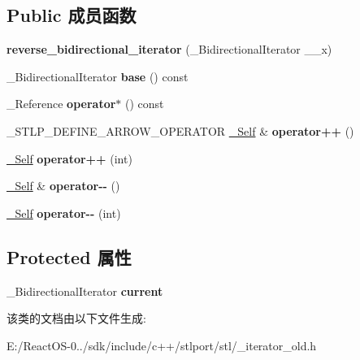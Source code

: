 \subsection*{Public 成员函数}
\begin{DoxyCompactItemize}
\item 
\mbox{\label{classreverse__bidirectional__iterator_a68f458f3d096b036aea2db262d3d57cf}} 
{\bfseries reverse\+\_\+bidirectional\+\_\+iterator} (\+\_\+\+Bidirectional\+Iterator \+\_\+\+\_\+x)
\item 
\mbox{\label{classreverse__bidirectional__iterator_a115b08a7672cf32547b59628d62e228e}} 
\+\_\+\+Bidirectional\+Iterator {\bfseries base} () const
\item 
\mbox{\label{classreverse__bidirectional__iterator_aca35f4162e15e129ca095767829677f9}} 
\+\_\+\+Reference {\bfseries operator$\ast$} () const
\item 
\mbox{\label{classreverse__bidirectional__iterator_a85007a3b88e5503216549b469449a344}} 
\+\_\+\+S\+T\+L\+P\+\_\+\+D\+E\+F\+I\+N\+E\+\_\+\+A\+R\+R\+O\+W\+\_\+\+O\+P\+E\+R\+A\+T\+OR \hyperlink{classreverse__bidirectional__iterator}{\+\_\+\+Self} \& {\bfseries operator++} ()
\item 
\mbox{\label{classreverse__bidirectional__iterator_a14fd29eeb63789552e0a4ec80a89f7f7}} 
\hyperlink{classreverse__bidirectional__iterator}{\+\_\+\+Self} {\bfseries operator++} (int)
\item 
\mbox{\label{classreverse__bidirectional__iterator_a3a09dadb81cd2080c273f46ac3566453}} 
\hyperlink{classreverse__bidirectional__iterator}{\+\_\+\+Self} \& {\bfseries operator-\/-\/} ()
\item 
\mbox{\label{classreverse__bidirectional__iterator_a89202bfc8503efca23e3a146cbdfde9a}} 
\hyperlink{classreverse__bidirectional__iterator}{\+\_\+\+Self} {\bfseries operator-\/-\/} (int)
\end{DoxyCompactItemize}
\subsection*{Protected 属性}
\begin{DoxyCompactItemize}
\item 
\mbox{\label{classreverse__bidirectional__iterator_af65fbccd930a5f03a231408dd84368d3}} 
\+\_\+\+Bidirectional\+Iterator {\bfseries current}
\end{DoxyCompactItemize}


该类的文档由以下文件生成\+:\begin{DoxyCompactItemize}
\item 
E\+:/\+React\+O\+S-\/0../sdk/include/c++/stlport/stl/\+\_\+iterator\+\_\+old.\+h\end{DoxyCompactItemize}
